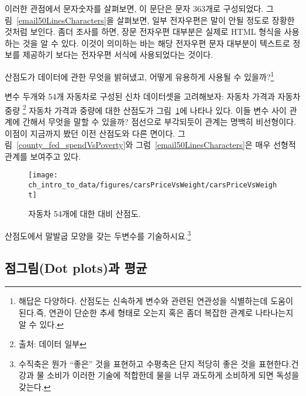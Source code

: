 \textC{\setlength{\captionwidth}{\mycaptionwidth}}

이러한 관점에서 문자숫자를 살펴보면, 이 문단은 문자 363개로 구성되었다.
그림~\ref{email50LinesCharacters}을 살펴보면, 일부 전자우편은 말이 안될 정도로 장황한 것처럼 보인다.
좀더 조사를 하면, 장문 전자우편 대부분은 실제로 HTML 형식을 사용하는 것을 알 수 있다.
이것이 의미하는 바는 해당 전자우편 문자 대부분이 텍스트로 정보를 제공하기 보다는 전자우편 서식에 사용되었다는 것이다.


\begin{exercise}
산점도가 데이터에 관한 무엇을 밝혀냈고, 어떻게 유용하게 사용될 수 있을까?\footnote{해답은 다양하다. 산점도는 신속하게 변수와 관련된 연관성을 식별하는데 도움이 된다.즉, 연관이 단순한 추세 형태로 오는지 혹은 좀더 복잡한 관계로 나타나는지 알 수 있다.}
\end{exercise}

\begin{example}{
변수 두개와 54개 자동차로 구성된 신차 데이터셋을 고려해보자: 자동차 가격과 자동차 중량
\footnote{출처:  데이터 일부}
자동차 가격과 중량에 대한 산점도가 그림~\ref{carsPriceVsWeight}에 나타나 있다.
이들 변수 사이 관계에 간해서 무엇을 말할 수 있을까?}
점선으로 부각되듯이 관계는 명백히 비선형이다.
이점이 지금까지 봤던 이전 산점도와 다른 면이다. 그림~\vref{county_fed_spendVsPoverty}와 그럼~\ref{email50LinesCharacters}은 매우 선형적 관계를 보여주고 있다.

\begin{figure}[h]
   \centering
   \texttt{[image: ch\_intro\_to\_data/figures/carsPriceVsWeight/carsPriceVsWeight]}
   \caption{자동차 54개에 대한  대비  산점도.}
   \label{carsPriceVsWeight}
\end{figure}
\end{example}

\begin{exercise}
산점도에서 말발굽 모양을 갖는 두변수를 기술하시요.\footnote{
수직축은 뭔가 ``좋은'' 것을 표현하고 수평축은 단지 적당히 좋은 것을 표현한다.건강과 물 소비가 이러한 기술에 적합한데 물을 너무 과도하게 소비하게 되면 독성을 갖는다.}
\end{exercise}

\subsection{점그림(Dot plots)과 평균}
\label{dotPlot}


